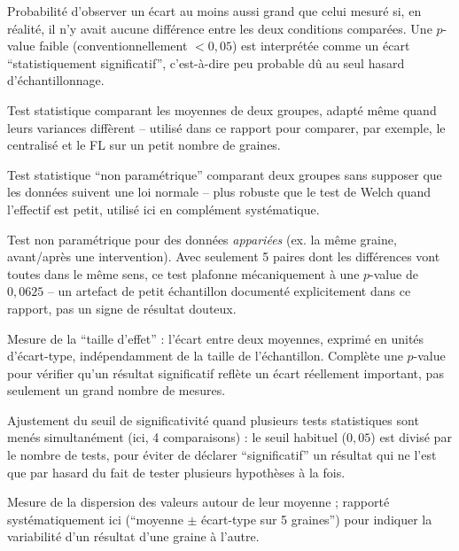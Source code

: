 \documentclass[11pt]{article}
\begin{document}
\begin{description}[leftmargin=0em, style=nextline]

\item[$p$-value] Probabilité d'observer un écart au moins aussi grand que celui mesuré
si, en réalité, il n'y avait aucune différence entre les deux conditions comparées. Une
$p$-value faible (conventionnellement $<0{,}05$) est interprétée comme un écart
``statistiquement significatif'', c'est-à-dire peu probable dû au seul hasard
d'échantillonnage.

\item[Test de Welch] Test statistique comparant les moyennes de deux groupes, adapté
même quand leurs variances diffèrent -- utilisé dans ce rapport pour comparer, par
exemple, le centralisé et le FL sur un petit nombre de graines.

\item[Test de Mann-Whitney (U)] Test statistique ``non paramétrique'' comparant deux
groupes sans supposer que les données suivent une loi normale -- plus robuste que le
test de Welch quand l'effectif est petit, utilisé ici en complément systématique.

\item[Test de Wilcoxon (signé, apparié)] Test non paramétrique pour des données
\emph{appariées} (ex. la même graine, avant/après une intervention). Avec seulement 5
paires dont les différences vont toutes dans le même sens, ce test plafonne
mécaniquement à une $p$-value de $0{,}0625$ -- un artefact de petit échantillon
documenté explicitement dans ce rapport, pas un signe de résultat douteux.

\item[Cohen's $d$] Mesure de la ``taille d'effet'' : l'écart entre deux moyennes,
exprimé en unités d'écart-type, indépendamment de la taille de l'échantillon.
Complète une $p$-value pour vérifier qu'un résultat significatif reflète un écart
réellement important, pas seulement un grand nombre de mesures.

\item[Correction de Bonferroni] Ajustement du seuil de significativité quand plusieurs
tests statistiques sont menés simultanément (ici, 4 comparaisons) : le seuil habituel
($0{,}05$) est divisé par le nombre de tests, pour éviter de déclarer ``significatif'' un
résultat qui ne l'est que par hasard du fait de tester plusieurs hypothèses à la fois.

\item[Écart-type] Mesure de la dispersion des valeurs autour de leur moyenne ; rapporté
systématiquement ici (``moyenne $\pm$ écart-type sur 5 graines'') pour indiquer la
variabilité d'un résultat d'une graine à l'autre.

\end{description}
\end{document}
